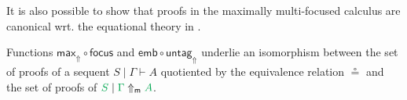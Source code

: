 \documentclass[runningheads]{llncs}
\newcommand{\tl}{\otimes \mathsf{L}}
\newcommand{\lright}{{\multimap}\mathsf{R}}
\newcommand{\unitl}{\mathsf{IL}}
\newcommand{\otL}{\tl}
\newcommand{\lolliR}{\lright}
\newcommand{\IL}{\unitl}
\newcommand{\green}[1]{{\color{Green}#1}}
\newcommand{\up}{\Uparrow}
\newcommand{\dn}{\Downarrow}
\newcommand{\upm}{\Uparrow_{\mathsf{m}}}
\newcommand{\focus}{\mathsf{focus}}
\newcommand{\emb}{\mathsf{emb}}
\begin{document}
It is also possible to show that proofs in the maximally multi-focused calculus are canonical wrt. the equational theory in .
\begin{theorem}\label{thm3}
  Functions $\mathsf{max}_\up\circ \focus$ and $\emb \circ \mathsf{untag}_\up$ underlie an isomorphism between the set of proofs of a sequent $S \mid \Gamma \vdash A$ quotiented by the equivalence relation $\circeq$ and the set of proofs of $\green{S} \mid \green{\Gamma} \upm \green{A}$. %
\end{theorem}



\end{document}
